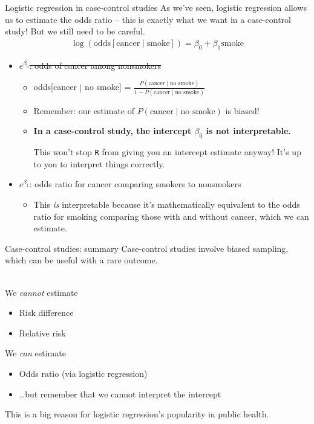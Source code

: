 \documentclass[10pt,t]{beamer}
\newcommand\tab[1][1cm]{\hspace*{#1}}
\begin{document}
\begin{frame}{Logistic regression in case-control studies}
	As we've seen, logistic regression allows us to estimate the odds ratio -- this is exactly what we want in a case-control study! But we still need to be careful. 
	\begin{align*}
		\log(\text{odds}[\text{cancer} \mid \text{smoke}]) = \beta_0 + \beta_1 \text{smoke}
	\end{align*}
	\begin{itemize}
		\item \sout{$e^{\beta_0}$: odds of cancer among nonsmokers}
		\begin{itemize}
			\item odds[cancer $\mid$ no smoke] = $\frac{P(\text{cancer} \mid \text{no smoke})}{1 - P(\text{cancer} \mid \text{no smoke})}$
			\item Remember: our estimate of $P(\text{cancer} \mid \text{no smoke})$ is biased! 
			\item \textbf{In a case-control study, the intercept $\beta_0$ is not interpretable.} \begin{tiny}
				This won't stop \texttt{R} from giving you an intercept estimate anyway! It's up to you to interpret things correctly.
			\end{tiny}
		\end{itemize}
	\item $e^{\beta_1}$: odds ratio for cancer comparing smokers to nonsmokers
	\begin{itemize}
		\item This \textit{is} interpretable because it's mathematically equivalent to the odds ratio for smoking comparing those with and without cancer, which we can estimate. 
	\end{itemize}
	\end{itemize}
\end{frame}

\begin{frame}{Case-control studies: summary}
	Case-control studies involve biased sampling, which can be useful with a rare outcome. 
	\\ ~\ 
	
	We \textit{cannot} estimate
	\begin{itemize}
		\item Risk difference 
		\item Relative risk
	\end{itemize}
	\vspace{0.2cm}
	We \textit{can} estimate
	\begin{itemize}
		\item Odds ratio (via logistic regression)
		\item[] \tab \dots but remember that we cannot interpret the intercept
	\end{itemize}
	\vspace{0.2cm}
	This is a big reason for logistic regression's popularity in public health.  
\end{frame}
\end{document}
